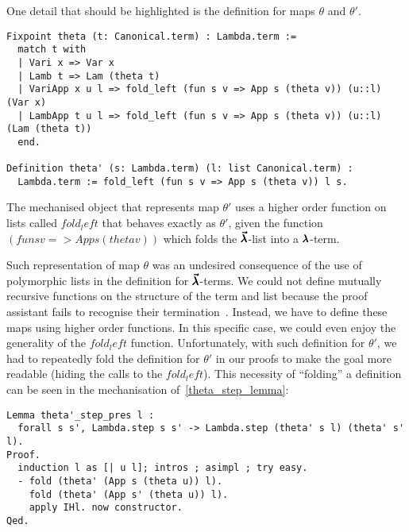 One detail that should be highlighted is the definition for maps $\theta$ and $\theta'$.
\begin{lstlisting}[language=Coq]
Fixpoint theta (t: Canonical.term) : Lambda.term :=
  match t with
  | Vari x => Var x
  | Lamb t => Lam (theta t)
  | VariApp x u l => fold_left (fun s v => App s (theta v)) (u::l) (Var x)
  | LambApp t u l => fold_left (fun s v => App s (theta v)) (u::l) (Lam (theta t))
  end.

Definition theta' (s: Lambda.term) (l: list Canonical.term) :
  Lambda.term := fold_left (fun s v => App s (theta v)) l s.
\end{lstlisting}

The mechanised object that represents map $\theta'$ uses a higher order function on lists called \lst$fold_left$ that behaves exactly as $\theta'$, given the function \lst$(fun s v => App s (theta v))$ which folds the $\pmb{\vec \lambda}$-list into a $\pmb{\lambda}$-term.

Such representation of map $\theta$ was an undesired consequence of the use of polymorphic lists in the definition for $\pmb{\vec \lambda}$-terms.
We could not define mutually recursive functions on the structure of the term and list because the proof assistant fails to recognise their termination~\cite{YvesStackOverflow}.
Instead, we have to define these maps using higher order functions.
In this specific case, we could even enjoy the generality of the \lst$fold_left$ function.
Unfortunately, with such definition for $\theta'$, we had to repeatedly fold the definition for $\theta'$ in our proofs to make the goal more readable (hiding the calls to the \lst$fold_left$).
This necessity of ``folding'' a definition can be seen in the mechanisation of~\cref{theta_step_lemma}:
\begin{lstlisting}[language=Coq]
Lemma theta'_step_pres l :
  forall s s', Lambda.step s s' -> Lambda.step (theta' s l) (theta' s' l).
Proof.
  induction l as [| u l]; intros ; asimpl ; try easy.
  - fold (theta' (App s (theta u)) l).
    fold (theta' (App s' (theta u)) l).
    apply IHl. now constructor.
Qed.
\end{lstlisting}


